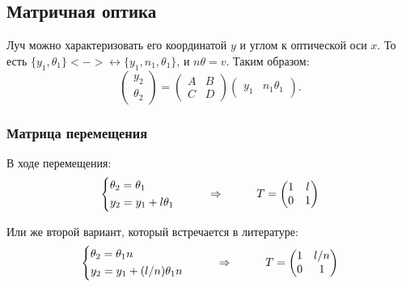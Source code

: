 \subsection*{Матричная оптика}

Луч можно характеризовать его координатой $y$ и углом к оптической оси $x$. То есть $\{ y_1, \theta_1\} <->\leftrightarrow \{y_1, n_1, \theta_1\}$, и $n \theta = v$. Таким образом:
\begin{equation*}
	\begin{pmatrix}
		y_2 \\ \theta_2
	\end{pmatrix}
	=
	\begin{pmatrix}
		A & B \\ C & D
	\end{pmatrix}
	\begin{pmatrix}
		y_1 & n_1 \theta_1
	\end{pmatrix}.
\end{equation*}

\subsubsection*{Матрица перемещения}
В ходе перемещения:
\begin{equation*}
	\left\{
	\begin{aligned}
		&\theta_2 = \theta_1\\
		&y_2 = y_1 + l \theta_1
	\end{aligned}
	\right.
	\hspace{1 cm}
	\Rightarrow
	\hspace{1 cm}
	T = \begin{pmatrix}
		1 & l \\
		0 & 1
	\end{pmatrix}
\end{equation*}

Или же второй вариант,  который встречается в литературе:
\begin{equation}
	\left\{
	\begin{aligned}
		&\theta_2 = \theta_1 n \\
		&y_2 = y_1 + (l/n) \theta_1 n
	\end{aligned}
	\right.
	\hspace{1 cm}
	\Rightarrow
	\hspace{1 cm}
	T = \begin{pmatrix}
		1 & l/n \\
		0 & 1
	\end{pmatrix}
	\label{t-matrix}
\end{equation}

